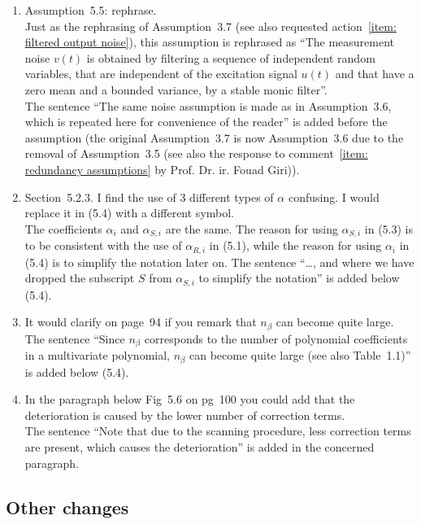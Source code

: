 \documentclass{article}
\newenvironment{answer}{\noindent\ignorespaces\color{blue}}{\noindent\ignorespacesafterend}
\newcommand{\ans}[1]{\begin{answer}#1\end{answer}}
\newcommand{\oldnewpage}[2]{\marginpar{{\color{black}#1} / {\color{red}#2}}}
\begin{document}
\begin{enumerate}
	\item Assumption~5.5: rephrase.\\
		\ans{\oldnewpage{93}{97}Just as the rephrasing of Assumption~3.7 (see also requested action~\ref{item: filtered output noise}), this assumption is rephrased as ``The measurement noise $v(t)$ is obtained by filtering a sequence of independent random variables, that are independent of the excitation signal $u(t)$ and that have a zero mean and a bounded variance, by a stable monic filter''.\\ The sentence ``The same noise assumption is made as in Assumption~3.6, which is repeated here for convenience of the reader'' is added before the assumption (the original Assumption~3.7 is now Assumption~3.6 due to the removal of Assumption~3.5 (see also the response to comment~\ref{item: redundancy assumptions} by Prof. Dr. ir. Fouad Giri)).}
	\item Section~5.2.3. I find the use of 3 different types of $\alpha$ confusing. I would replace it in (5.4) with a different symbol.\\
		\ans{\oldnewpage{94}{98--99}The coefficients $\alpha_i$ and $\alpha_{S,i}$ are the same. The reason for using $\alpha_{S,i}$ in (5.3) is to be consistent with the use of $\alpha_{R,i}$ in (5.1), while the reason for using $\alpha_i$ in (5.4) is to simplify the notation later on. The sentence ``\ldots, and where we have dropped the subscript $S$ from $\alpha_{S,i}$ to simplify the notation'' is added below (5.4).}
	\item It would clarify on page~94 if you remark that $n_\beta$ can become quite large.\\
		\ans{\oldnewpage{94}{99}The sentence ``Since $n_\beta$ corresponds to the number of polynomial coefficients in a multivariate polynomial, $n_\beta$ can become quite large (see also Table~1.1)'' is added below (5.4).}
	\item In the paragraph below Fig~5.6 on pg~100 you could add that the deterioration is caused by the lower number of correction terms.\\
		\ans{\oldnewpage{100}{104}The sentence ``Note that due to the scanning procedure, less correction terms are present, which causes the deterioration'' is added in the concerned paragraph.}
\end{enumerate}

\subsection*{Other changes}
\end{document}
